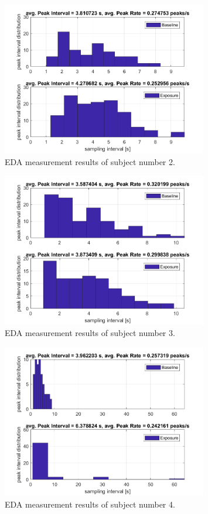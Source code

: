 \begin{figure}[H]
\centering
\includegraphics[width=0.8\textwidth]{images/2EDA.png}
\caption{EDA measurement results of subject number 2.}
\label{EDAtabImg}
\end{figure}

\begin{figure}[H]
\centering
\includegraphics[width=0.8\textwidth]{images/3EDA.png}
\caption{EDA measurement results of subject number 3.}
\label{EDAtabImg}
\end{figure}

\begin{figure}[H]
\centering
\includegraphics[width=0.8\textwidth]{images/4EDA.png}
\caption{EDA measurement results of subject number 4.}
\label{EDAtabImg}
\end{figure}

